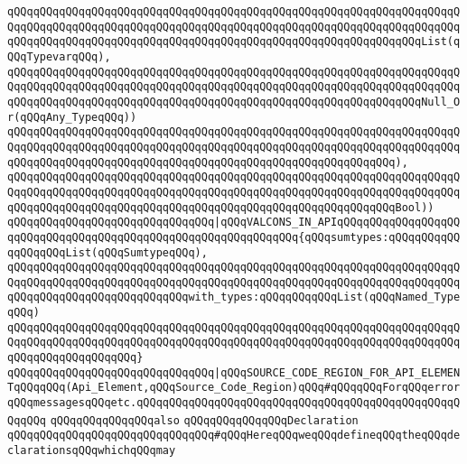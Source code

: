 \verb|qQQqqQQqqQQqqQQqqQQqqQQqqQQqqQQqqQQqqQQqqQQqqQQqqQQqqQQqqQQqqQQqqQQqqQQqqQQqqQQqqQQqqQQqqQQqqQQqqQQqqQQqqQQqqQQqqQQqqQQqqQQqqQQqqQQqqQQqqQQqqQQqqQQqqQQqqQQqqQQqqQQqqQQqqQQqqQQqqQQqqQQqqQQqqQQqqQQqqQQqqQQqList(qQQqTypevarqQQq),|\newline
\verb|qQQqqQQqqQQqqQQqqQQqqQQqqQQqqQQqqQQqqQQqqQQqqQQqqQQqqQQqqQQqqQQqqQQqqQQqqQQqqQQqqQQqqQQqqQQqqQQqqQQqqQQqqQQqqQQqqQQqqQQqqQQqqQQqqQQqqQQqqQQqqQQqqQQqqQQqqQQqqQQqqQQqqQQqqQQqqQQqqQQqqQQqqQQqqQQqqQQqqQQqqQQqNull_Or(qQQqAny_TypeqQQq))|\newline
\verb|qQQqqQQqqQQqqQQqqQQqqQQqqQQqqQQqqQQqqQQqqQQqqQQqqQQqqQQqqQQqqQQqqQQqqQQqqQQqqQQqqQQqqQQqqQQqqQQqqQQqqQQqqQQqqQQqqQQqqQQqqQQqqQQqqQQqqQQqqQQqqQQqqQQqqQQqqQQqqQQqqQQqqQQqqQQqqQQqqQQqqQQqqQQqqQQqqQQqqQQq),|\newline
\verb|qQQqqQQqqQQqqQQqqQQqqQQqqQQqqQQqqQQqqQQqqQQqqQQqqQQqqQQqqQQqqQQqqQQqqQQqqQQqqQQqqQQqqQQqqQQqqQQqqQQqqQQqqQQqqQQqqQQqqQQqqQQqqQQqqQQqqQQqqQQqqQQqqQQqqQQqqQQqqQQqqQQqqQQqqQQqqQQqqQQqqQQqqQQqqQQqqQQqqQQqBool))|\newline
\newline
\verb|qQQqqQQqqQQqqQQqqQQqqQQqqQQqqQQq|\verb#|qQQqVALCONS_IN_APIqQQqqQQqqQQqqQQqqQQqqQQqqQQqqQQqqQQqqQQqqQQqqQQqqQQqqQQqqQQqqQQq{qQQqsumtypes:qQQqqQQqqQQqqQQqqQQqList(qQQqSumtypeqQQq),#\newline
\verb|qQQqqQQqqQQqqQQqqQQqqQQqqQQqqQQqqQQqqQQqqQQqqQQqqQQqqQQqqQQqqQQqqQQqqQQqqQQqqQQqqQQqqQQqqQQqqQQqqQQqqQQqqQQqqQQqqQQqqQQqqQQqqQQqqQQqqQQqqQQqqQQqqQQqqQQqqQQqqQQqqQQqqQQqwith_types:qQQqqQQqqQQqList(qQQqNamed_TypeqQQq)|\newline
\verb|qQQqqQQqqQQqqQQqqQQqqQQqqQQqqQQqqQQqqQQqqQQqqQQqqQQqqQQqqQQqqQQqqQQqqQQqqQQqqQQqqQQqqQQqqQQqqQQqqQQqqQQqqQQqqQQqqQQqqQQqqQQqqQQqqQQqqQQqqQQqqQQqqQQqqQQqqQQqqQQq}|\newline
\newline
\verb|qQQqqQQqqQQqqQQqqQQqqQQqqQQqqQQq|\verb#|qQQqSOURCE_CODE_REGION_FOR_API_ELEMENTqQQqqQQq(Api_Element,qQQqSource_Code_Region)qQQq#\verb|#qQQqqQQqForqQQqerrorqQQqmessagesqQQqetc.qQQqqQQqqQQqqQQqqQQqqQQqqQQqqQQqqQQqqQQqqQQqqQQqqQQqqQQq|\newline
\newline
\newline
\newline
\verb|qQQqqQQqqQQqqQQqalso|\newline
\verb|qQQqqQQqqQQqqQQqDeclaration|\newline
\newline
\verb|qQQqqQQqqQQqqQQqqQQqqQQqqQQqqQQq#qQQqHereqQQqweqQQqdefineqQQqtheqQQqdeclarationsqQQqwhichqQQqmay|\newline
